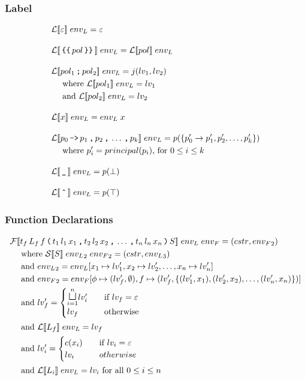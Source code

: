 \subsubsection{Label}
\begin{align*}
& \iL\dblSq{\varepsilon} \; \ienvL = \varepsilon \rspace
%
& \iL\dblSq{\tk{\{\{} pol \tk{\}\}}} \; \ienvL = \iL\dblSq{pol} \; \ienvL \rspace
%
& \iL\dblSq{pol_1 \tk ; pol_2} \; \ienvL = j(\ilv_1, \ilv_2) \\
& \dsWhere{\iL\dblSq{pol_1} \; \ienvL = \ilv_1} \\
& \dsAnd{\iL\dblSq{pol_2} \; \ienvL = \ilv_2} \rspace
%
& \iL\dblSq{x} \; \ienvL = \ienvL \; x \rspace
%
& \iL\dblSq{p_0 \tk{->} p_1 \tk , p_2 \tk, \dots \tk , p_k} \; \ienvL = p(\{p_0' \rightarrow p_1', p_2', \dots, p_k'\}) \\
& \dsWhere{p_i' = principal(p_i) \text{, for } 0 \leq i \leq k} \rspace
%
& \iL\dblSq{\tk \_} \; \ienvL = p(\bot) \rspace
& \iL\dblSq{\tk{\^{}}} \; \ienvL = p(\top)
\end{align*}

\subsubsection{Function Declarations}
\begin{align*}
& \iF\dblSq{t_f \, L_f \, f \tk ( t_1 \, l_1 \, x_1 \tk , t_2 \, l_2 \, x_2 \tk , \dots \tk , t_n \, l_n \, x_n \tk ) S} \; \ienvL \; \ienvF
  =  (\icstr, \ienvF_2) \\
& \dsWhere{\iS\dblSq{S} \; \ienvL_2 \; \ienvF_2 = (\icstr, \ienvL_3)} \\
& \dsAnd{\ienvL_2 = \ienvL[x_1 \mapsto \ilv_1', x_2 \mapsto \ilv_2', \dots, x_n \mapsto \ilv_n']} \\
& \dsAnd{\ienvF_2 = \ienvF[\ifb \mapsto (\ilv_f', \emptyset), f \mapsto (\ilv_f', \{(\ilv_1', x_1), (\ilv_2', x_2), \dots, (\ilv_n', x_n)\})]} \\
& \dsAnd{\ilv_f' = \begin{cases}
    \mathlarger\sqcupl_{i = 1}^n \ilv_i' & \quad \text{if } \ilv_f = \varepsilon \\
    \ilv_f & \quad \text{otherwise}
  \end{cases}} \\
& \dsAnd{\iL\dblSq{L_f} \; \ienvL = \ilv_f} \\
& \dsAnd{\ilv_i' = \begin{cases}
    c(x_i) & \quad \text{if } \ilv_i = \varepsilon \\
    \ilv_i & \quad otherwise
  \end{cases}} \\
& \dsAnd{\iL\dblSq{L_i} \; \ienvL = \ilv_i \text{ for all } 0 \leq i \leq n}
\end{align*}

